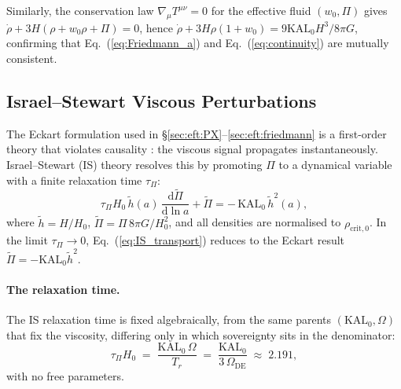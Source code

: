Similarly, the conservation law $\nabla_{\!\mu}T^{\mu\nu}=0$ for the effective
fluid $(w_{0},\Pi)$ gives
$\dot{\rho} + 3H(\rho + w_{0}\rho + \Pi) = 0$, hence
$\dot{\rho} + 3H\rho(1+w_{0}) = 9\mathrm{KAL}_{0}H^{3}/8\pi G$,
confirming that Eq.~(\ref{eq:Friedmann_a}) and Eq.~(\ref{eq:continuity})
are mutually consistent.

\subsection{Israel--Stewart Viscous Perturbations}
\label{sec:eft:IS}

The Eckart formulation used in \S\ref{sec:eft:PX}--\ref{sec:eft:friedmann}
is a first-order theory that violates causality \citep{HiscockLindblom1985}:
the viscous signal propagates instantaneously.  Israel--Stewart (IS) theory
\citep{Israel1976,IsraelStewart1979,Maartens1996} resolves this by promoting $\Pi$ to a dynamical
variable with a finite relaxation time $\tau_{\Pi}$:
%
\begin{equation}
  \tau_{\Pi} H_{0}\,\tilde{h}(a)\,
    \frac{\mathrm{d}\tilde{\Pi}}{\mathrm{d}\ln a}
  + \tilde{\Pi}
  = -\,\mathrm{KAL}_{0}\,\tilde{h}^{2}(a),
  \label{eq:IS_transport}
\end{equation}
%
where $\tilde{h} = H/H_{0}$, $\tilde{\Pi} = \Pi\,8\pi G/H_{0}^{2}$, and
all densities are normalised to $\rho_{\mathrm{crit},0}$.  In the
limit $\tau_{\Pi} \to 0$, Eq.~(\ref{eq:IS_transport}) reduces to the
Eckart result $\tilde{\Pi} = -\mathrm{KAL}_{0}\tilde{h}^{2}$.

\paragraph{The relaxation time.}
The IS relaxation time is fixed algebraically, from the same parents
$(\mathrm{KAL}_{0},\Omega)$ that fix the viscosity, differing only in which
sovereignty sits in the denominator:
%
\begin{equation}
  \tau_{\Pi} H_{0}
    \;=\; \frac{\mathrm{KAL}_{0}\,\Omega}{T_{r}}
    \;=\; \frac{\mathrm{KAL}_{0}}{3\,\Omega_{\mathrm{DE}}}
    \;\approx\; 2.191,
  \label{eq:tau_IS}
\end{equation}
%
with no free parameters.

